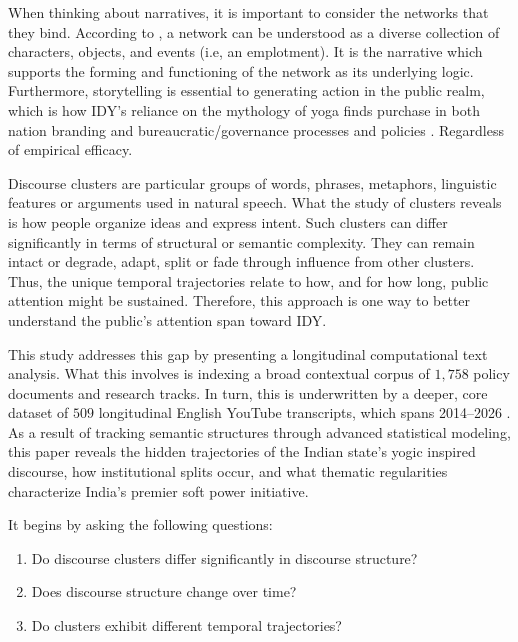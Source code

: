 \documentclass[11pt]{article}
\begin{document}
When thinking about narratives, it is important to consider the networks that they bind. According to \cite{lejano2013}, a network can be understood as a diverse collection of characters, objects, and events (i.e, an emplotment). It is the narrative which supports the forming and functioning of the network as its underlying logic. Furthermore, storytelling is essential to generating action in the public realm, which is how IDY's reliance on the mythology of yoga finds purchase in both nation branding and bureaucratic/governance processes and policies \cite{deneufville1987}. Regardless of empirical efficacy.

Discourse clusters are particular groups of words, phrases, metaphors, linguistic features or arguments used in natural speech. What the study of clusters reveals is how people organize ideas and express intent. Such clusters can differ significantly in terms of structural or semantic complexity. They can remain intact or degrade, adapt, split or fade through influence from other clusters. Thus, the unique temporal trajectories relate to how, and for how long, public attention might be sustained. Therefore, this approach is one way to better understand the public's attention span toward IDY.

This study addresses this gap by presenting a longitudinal computational text analysis. What this involves is indexing a broad contextual corpus of $1,758$ policy documents and research tracks. In turn, this is underwritten by a deeper, core dataset of $509$ longitudinal English YouTube transcripts, which spans 2014--2026 \cite{bonikowski2022}. As a result of tracking semantic structures through advanced statistical modeling, this paper reveals the hidden trajectories of the Indian state's yogic inspired discourse, how institutional splits occur, and what thematic regularities characterize India's premier soft power initiative.

It begins by asking the following questions:

\begin{enumerate}

\item Do discourse clusters differ significantly in discourse structure?

\item Does discourse structure change over time?

\item Do clusters exhibit different temporal trajectories?

\end{enumerate}
\end{document}
